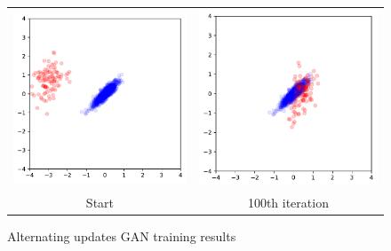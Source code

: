 \documentclass[12pt]{article}
\newcommand{\figw}{7cm}
\begin{document}
\begin{figure}
\centering
\begin{tabular}{cc}
  \includegraphics[width=\figw]{hw2/codes/gan/plots/simultaneous/0.pdf} &   \includegraphics[width=\figw]{hw2/codes/gan/plots/simultaneous/1.pdf} \\
Start & 100th iteration \\[6pt]
\end{tabular}
\caption{Alternating updates GAN training results} \label{fig:alternating}
\end{figure}
\end{document}
